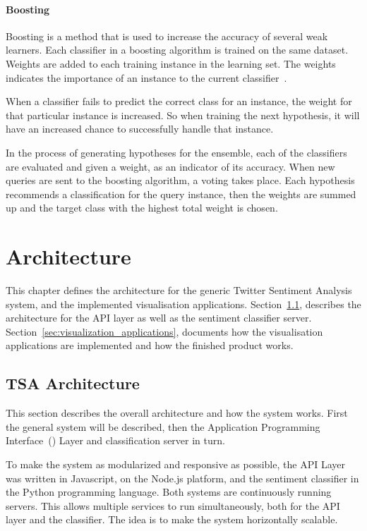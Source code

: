 \subsubsection{Boosting}

Boosting is a method that is used to increase the accuracy of several weak learners. Each classifier in a boosting algorithm is trained on the same dataset. Weights are added to each training instance in the learning set. The weights indicates the importance of an instance to the current classifier~\citep{Freund;Schapire:97}. 

When a classifier fails to predict the correct class for an instance, the weight for that particular instance is increased. So when training the next hypothesis, it will have an increased chance to successfully handle that instance.

In the process of generating hypotheses for the ensemble, each of the classifiers are evaluated and given a weight, as an indicator of its accuracy. When new queries are sent to the boosting algorithm, a voting takes place. Each hypothesis recommends a classification for the query instance, then the weights are summed up and the target class with the highest total weight is chosen.

\chapter{Architecture}
\label{sec:experimentalsetup}

This chapter defines the architecture for the generic Twitter Sentiment Analysis system, and the implemented visualisation applications. Section~\ref{sec:tsaarchitecture}, describes the architecture for the API layer as well as the sentiment classifier server. Section~\ref{sec:visualization_applications}, documents how the visualisation applications are implemented and how the finished product works.

\section{TSA Architecture}
\label{sec:tsaarchitecture}

This section describes the overall architecture and how the system works. First the general system will be described, then the Application Programming Interface~() Layer and classification server in turn.  

To make the system as modularized and responsive as possible, the API Layer was written in Javascript, on the Node.js platform, and the sentiment classifier in the Python programming language. Both systems are continuously running servers. This allows multiple services to run simultaneously, both for the API layer and the classifier. The idea is to make the system horizontally scalable.

